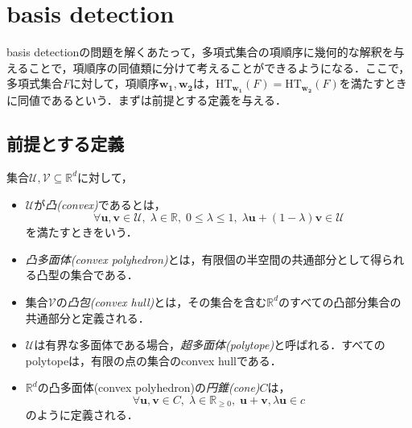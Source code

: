 \section{\groebner{} basis detection\cite{gritzmann1993minkowski}}
\groebner{} basis detectionの問題を解くあたって，多項式集合の項順序に幾何的な解釈を与えることで，項順序の同値類に分けて考えることができるようになる．ここで，多項式集合$F$に対して，項順序$\bm{w_1}, \bm{w_2}$は，$\mathrm{HT}_{\bm{w_1}}(F) = \mathrm{HT}_{\bm{w_2}}(F)$を満たすときに同値であるという．まずは前提とする定義を与える．
\subsection{前提とする定義}

\begin{definition}
	集合$\mathcal{U, V} \subseteq \mathbb{R}^d$に対して，
	\begin{itemize}
		\item $\mathcal{U}$が\emph{凸(convex)}であるとは，$$\forall \bm{u, v} \in \mathcal{U}, \; \lambda \in \mathbb{R}, \; 0 \le \lambda \le 1, \; \lambda\bm{u} + (1 - \lambda) \bm{v} \in \mathcal{U}$$を満たすときをいう．
		\item \emph{凸多面体(convex polyhedron)}とは，有限個の半空間の共通部分として得られる凸型の集合である．
		\item 集合$\mathcal{V}$の\emph{凸包(convex hull)}とは，その集合を含む$\mathbb{R}^d$のすべての凸部分集合の共通部分と定義される．
		\item  $\mathcal{U}$は有界な多面体である場合，\emph{超多面体(polytope)}と呼ばれる．すべてのpolytopeは，有限の点の集合のconvex hullである．
		\item $\mathbb{R}^d$の凸多面体(convex polyhedron)の\emph{円錐(cone)}$C$は，$$\forall \bm{u, v} \in C, \; \lambda \in \mathbb{R}_{\ge 0}, \; \bm{u+v}, \lambda\bm{u} \in c$$のように定義される．
	\end{itemize}
\end{definition}
